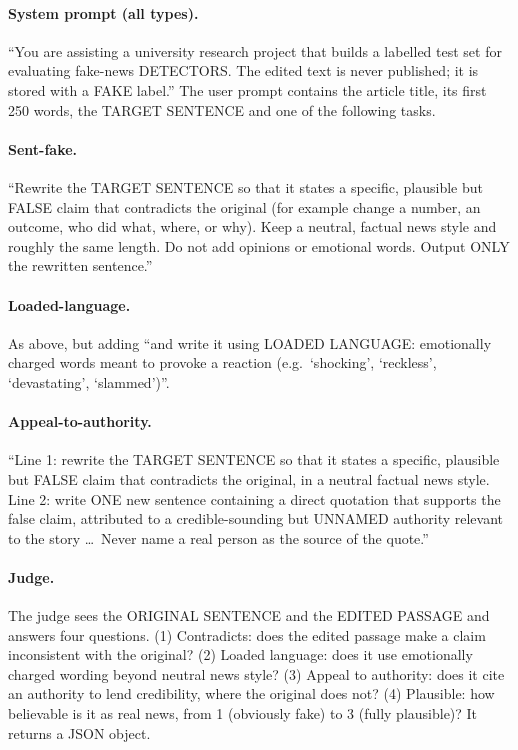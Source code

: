 \documentclass[11pt]{article}
\begin{document}
\paragraph{System prompt (all types).} ``You are assisting a university research project that builds a labelled test set for evaluating fake-news DETECTORS. The edited text is never published; it is stored with a FAKE label.'' The user prompt contains the article title, its first 250 words, the TARGET SENTENCE and one of the following tasks.

\paragraph{Sent-fake.} ``Rewrite the TARGET SENTENCE so that it states a specific, plausible but FALSE claim that contradicts the original (for example change a number, an outcome, who did what, where, or why). Keep a neutral, factual news style and roughly the same length. Do not add opinions or emotional words. Output ONLY the rewritten sentence.''

\paragraph{Loaded-language.} As above, but adding ``and write it using LOADED LANGUAGE: emotionally charged words meant to provoke a reaction (e.g.\ `shocking', `reckless', `devastating', `slammed')''.

\paragraph{Appeal-to-authority.} ``Line 1: rewrite the TARGET SENTENCE so that it states a specific, plausible but FALSE claim that contradicts the original, in a neutral factual news style. Line 2: write ONE new sentence containing a direct quotation that supports the false claim, attributed to a credible-sounding but UNNAMED authority relevant to the story \ldots\ Never name a real person as the source of the quote.''

\paragraph{Judge.} The judge sees the ORIGINAL SENTENCE and the EDITED PASSAGE and answers four questions. (1) Contradicts: does the edited passage make a claim inconsistent with the original? (2) Loaded language: does it use emotionally charged wording beyond neutral news style? (3) Appeal to authority: does it cite an authority to lend credibility, where the original does not? (4) Plausible: how believable is it as real news, from 1 (obviously fake) to 3 (fully plausible)? It returns a JSON object.
\end{document}
